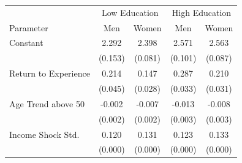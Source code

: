\begin{tabular}{lcccc}
    \toprule
     & \multicolumn{2}{c}{Low Education} & \multicolumn{2}{c}{High Education} \\
    Parameter & Men & Women & Men & Women \\
    \midrule
    Constant & 2.292 & 2.398 & 2.571 & 2.563 \\
     & (0.153) & (0.081) & (0.101) & (0.087) \\
    Return to Experience & 0.214 & 0.147 & 0.287 & 0.210 \\
     & (0.045) & (0.028) & (0.033) & (0.031) \\
    Age Trend above 50 & -0.002 & -0.007 & -0.013 & -0.008 \\
     & (0.002) & (0.002) & (0.003) & (0.003) \\
    Income Shock Std. & 0.120 & 0.131 & 0.123 & 0.133 \\
     & (0.000) & (0.000) & (0.000) & (0.000) \\
    \bottomrule
\end{tabular}
